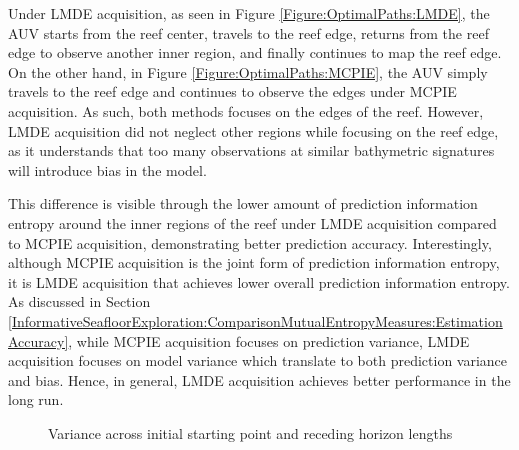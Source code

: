 			Under LMDE acquisition, as seen in Figure \ref{Figure:OptimalPaths:LMDE}, the AUV starts from the reef center, travels to the reef edge, returns from the reef edge to observe another inner region, and finally continues to map the reef edge. On the other hand, in Figure \ref{Figure:OptimalPaths:MCPIE}, the AUV simply travels to the reef edge and continues to observe the edges under MCPIE acquisition. As such, both methods focuses on the edges of the reef. However, LMDE acquisition did not neglect other regions while focusing on the reef edge, as it understands that too many observations at similar bathymetric signatures will introduce bias in the model.
			
			This difference is visible through the lower amount of prediction information entropy around the inner regions of the reef under LMDE acquisition compared to MCPIE acquisition, demonstrating better prediction accuracy. Interestingly, although MCPIE acquisition is the joint form of prediction information entropy, it is LMDE acquisition that achieves lower overall prediction information entropy. As discussed in Section \ref{InformativeSeafloorExploration:ComparisonMutualEntropyMeasures:EstimationAccuracy}, while MCPIE acquisition focuses on prediction variance, LMDE acquisition focuses on model variance which translate to both prediction variance and bias. Hence, in general, LMDE acquisition achieves better performance in the long run.

			\begin{figure}[!htbp]
			\centering
			\caption{Variance across initial starting point and receding horizon lengths}
			\label{Figure:VarianceSimulation}
			\end{figure}	
				
